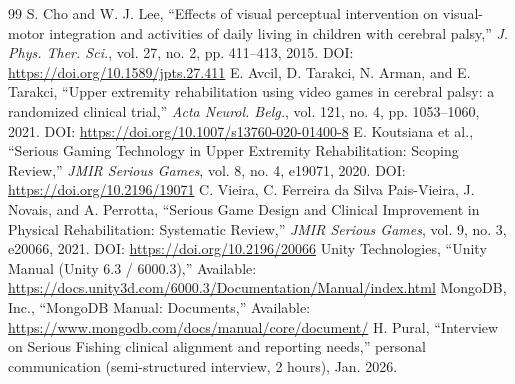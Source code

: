 \documentclass[12pt]{article}
\begin{document}
\begin{thebibliography}{99}
 S. Cho and W. J. Lee, ``Effects of visual perceptual intervention on visual-motor integration and activities of daily living in children with cerebral palsy,'' \textit{J. Phys. Ther. Sci.}, vol. 27, no. 2, pp. 411--413, 2015. DOI: \url{https://doi.org/10.1589/jpts.27.411}
 E. Avcil, D. Tarakci, N. Arman, and E. Tarakci, ``Upper extremity rehabilitation using video games in cerebral palsy: a randomized clinical trial,'' \textit{Acta Neurol. Belg.}, vol. 121, no. 4, pp. 1053--1060, 2021. DOI: \url{https://doi.org/10.1007/s13760-020-01400-8}
 E. Koutsiana et al., ``Serious Gaming Technology in Upper Extremity Rehabilitation: Scoping Review,'' \textit{JMIR Serious Games}, vol. 8, no. 4, e19071, 2020. DOI: \url{https://doi.org/10.2196/19071}
 C. Vieira, C. Ferreira da Silva Pais-Vieira, J. Novais, and A. Perrotta, ``Serious Game Design and Clinical Improvement in Physical Rehabilitation: Systematic Review,'' \textit{JMIR Serious Games}, vol. 9, no. 3, e20066, 2021. DOI: \url{https://doi.org/10.2196/20066}
 Unity Technologies, ``Unity Manual (Unity 6.3 / 6000.3),'' Available: \url{https://docs.unity3d.com/6000.3/Documentation/Manual/index.html}
 MongoDB, Inc., ``MongoDB Manual: Documents,'' Available: \url{https://www.mongodb.com/docs/manual/core/document/}
 H. Pural, ``Interview on Serious Fishing clinical alignment and reporting needs,'' personal communication (semi-structured interview, 2 hours), Jan. 2026.
\end{thebibliography}
\end{document}

